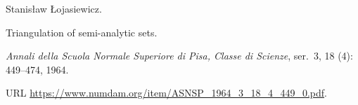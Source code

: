 Stanis{\l}aw {\L}ojasiewicz.

\newblock Triangulation of semi-analytic sets.

\newblock \emph{Annali della Scuola Normale Superiore di Pisa, Classe di
  Scienze}, ser.~3, 18 (4): 449--474, 1964.

\newblock URL \url{https://www.numdam.org/item/ASNSP_1964_3_18_4_449_0.pdf}.

